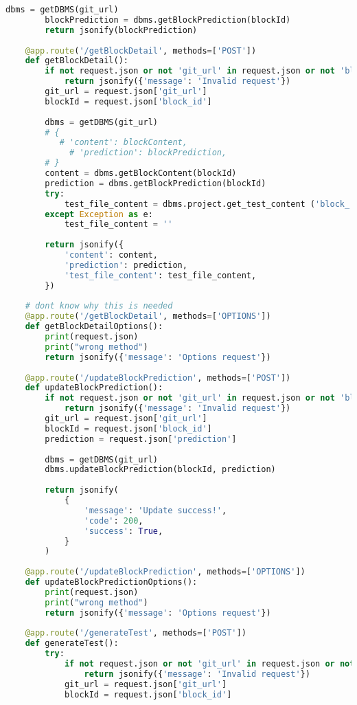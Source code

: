 \begin{lstlisting}[language=Python, caption={$\texttt{main.py}$ file.}, label={lst:15}]
        dbms = getDBMS(git_url)
        blockPrediction = dbms.getBlockPrediction(blockId)
        return jsonify(blockPrediction)
    
    @app.route('/getBlockDetail', methods=['POST'])
    def getBlockDetail():
        if not request.json or not 'git_url' in request.json or not 'block_id' in request.json:
            return jsonify({'message': 'Invalid request'})
        git_url = request.json['git_url']
        blockId = request.json['block_id']
        
        dbms = getDBMS(git_url)
        # {
           # 'content': blockContent,
             # 'prediction': blockPrediction, 
        # }
        content = dbms.getBlockContent(blockId)
        prediction = dbms.getBlockPrediction(blockId)
        try: 
            test_file_content = dbms.project.get_test_content ('block_' + str(blockId) + '_test.dart')
        except Exception as e:
            test_file_content = ''
            
        return jsonify({
            'content': content,
            'prediction': prediction,
            'test_file_content': test_file_content,
        })
    
    # dont know why this is needed
    @app.route('/getBlockDetail', methods=['OPTIONS'])
    def getBlockDetailOptions():
        print(request.json)
        print("wrong method")
        return jsonify({'message': 'Options request'})
    
    @app.route('/updateBlockPrediction', methods=['POST'])
    def updateBlockPrediction():
        if not request.json or not 'git_url' in request.json or not 'block_id' in request.json or not 'prediction' in request.json:
            return jsonify({'message': 'Invalid request'})
        git_url = request.json['git_url']
        blockId = request.json['block_id']
        prediction = request.json['prediction']
        
        dbms = getDBMS(git_url)
        dbms.updateBlockPrediction(blockId, prediction)
        
        return jsonify(
            {
                'message': 'Update success!',
                'code': 200,
                'success': True,
            }
        )
    
    @app.route('/updateBlockPrediction', methods=['OPTIONS'])
    def updateBlockPredictionOptions():
        print(request.json)
        print("wrong method")
        return jsonify({'message': 'Options request'})
        
    @app.route('/generateTest', methods=['POST'])
    def generateTest():
        try:
            if not request.json or not 'git_url' in request.json or not 'block_id' in request.json:
                return jsonify({'message': 'Invalid request'})
            git_url = request.json['git_url']
            blockId = request.json['block_id']
            

\end{lstlisting}
